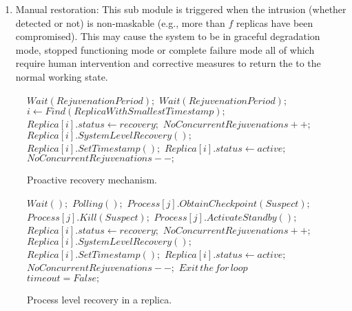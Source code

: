 \documentclass[preprint,number,12pt]{elsarticle}
\newenvironment{boxedalgorithmic}
{\begin{lrbox}{\ieeealgbox}
\begin{minipage}{\dimexpr\columnwidth-2\fboxsep-2\fboxrule}
\begin{algorithmic}}
{\end{algorithmic}
\end{minipage}
\end{lrbox}\noindent\fbox{\usebox{\ieeealgbox}}}
\begin{document}
\begin {enumerate}
finding any suspected process, it will obtain the relevant checkpoint, kills the process and activates its peer from the standby set (if there is any) otherwise the system level recovery will be performed. The process level recovery is time-saving compared to system level recovery as well as it is more secure since it involves internal information and communication exchange in a machine. Moreover, it does not require the replica to go offline for performing the recovery.
\item Manual restoration: This sub module is triggered when the intrusion (whether detected or not) is non-maskable (e.g., more than $f$ replicas have been compromised). This may cause the system to be in graceful degradation mode, stopped functioning mode or complete failure mode all of which require human intervention and corrective measures to return the to the normal working state.
\end{enumerate}
\begin{figure}
\begin{boxedalgorithmic}
\State  $Wait(RejuvenationPeriod);$
\State $Wait(RejuvenationPeriod);$
\EndWhile
\State $ i\gets Find(ReplicaWithSmallestTimestamp);$
\State $Replica[i].status\gets recovery;$
\State $NoConcurrentRejuvenations++;$
\State $Replica[i].SystemLevelRecovery();$
\State $Replica[i].SetTimestamp();$
\State $Replica[i].status\gets active;$
\State $NoConcurrentRejuvenations--;$
\EndProcedure
\end{boxedalgorithmic}
\caption{Proactive recovery mechanism.}\label{fig:proactiveRecovery}
\end{figure}
\begin{figure}
\begin{boxedalgorithmic}
\State $Wait ();$
\EndWhile
\State $Polling();$
\State $Process[j].ObtainCheckpoint(Suspect);$
\State $Process[j].Kill(Suspect);$
\State $Process[j].ActivateStandby();$
\Else
{}
\State $Replica[i].status\gets recovery;$
\State $NoConcurrentRejuvenations++;$
\State $Replica[i].SystemLevelRecovery();$
\State $Replica[i].SetTimestamp();$
\State $Replica[i].status\gets active;$
\State $NoConcurrentRejuvenations--;$
\State $Exit\, the\, for\, loop$
\EndIf
\EndIf
\EndFor
\State $timeout = False;$
\EndProcedure
\end{boxedalgorithmic}
\caption{Process level recovery in a replica.}\label{fig:processLevelrecovery}
\end{figure}
\end{document}
